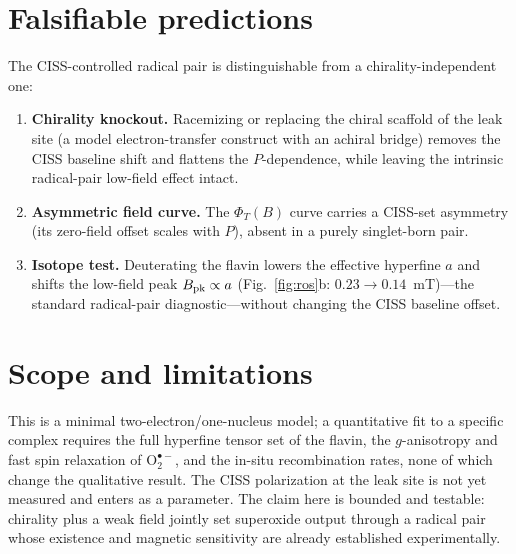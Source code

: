 \documentclass[11pt,a4paper]{article}
\begin{document}
\section{Falsifiable predictions}
The CISS-controlled radical pair is distinguishable from a
chirality-independent one:
\begin{enumerate}
\item \textbf{Chirality knockout.} Racemizing or replacing the chiral
  scaffold of the leak site (a model electron-transfer construct with an
  achiral bridge) removes the CISS baseline shift and flattens the
  $P$-dependence, while leaving the intrinsic radical-pair low-field
  effect intact.
\item \textbf{Asymmetric field curve.} The $\Phi_T(B)$ curve carries a
  CISS-set asymmetry (its zero-field offset scales with $P$), absent in a
  purely singlet-born pair.
\item \textbf{Isotope test.} Deuterating the flavin lowers the effective
  hyperfine $a$ and shifts the low-field peak $B_{\rm pk}\propto a$
  (Fig.~\ref{fig:ros}b: $0.23\!\to\!0.14$~mT)---the standard radical-pair
  diagnostic---without changing the CISS baseline offset.
\end{enumerate}

\section{Scope and limitations}
This is a minimal two-electron/one-nucleus model; a quantitative fit to a
specific complex requires the full hyperfine tensor set of the flavin, the
$g$-anisotropy and fast spin relaxation of $\text{O}_2^{\bullet-}$, and the
in-situ recombination rates, none of which change the qualitative result.
The CISS polarization at the leak site is not yet measured and enters as a
parameter. The claim here is bounded and testable: chirality plus a weak
field jointly set superoxide output through a radical pair whose existence
and magnetic sensitivity are already established experimentally.
\end{document}
